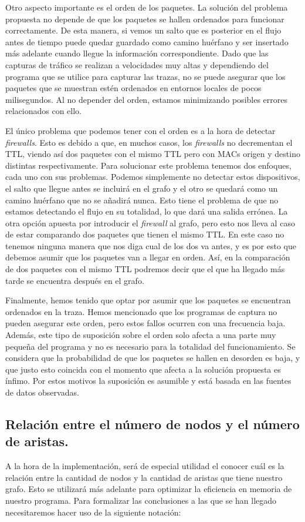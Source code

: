 \documentclass[tfg,epsbased,lof,lot,loa,covers,final,copyright,overleaf]{tfgtfmthesisuam}
\begin{document}
Otro aspecto importante es el orden de los paquetes. La solución del problema propuesta no depende de que los paquetes se hallen ordenados para funcionar correctamente. De esta manera, si vemos un salto que es posterior en el flujo antes de tiempo puede quedar guardado como camino huérfano y ser insertado más adelante cuando llegue la información correspondiente. Dado que las capturas de tráfico se realizan a velocidades muy altas y dependiendo del programa que se utilice para capturar las trazas, no se puede asegurar que los paquetes que se muestran estén ordenados en entornos locales de pocos milisegundos. Al no depender del orden, estamos minimizando posibles errores relacionados con ello.

El único problema que podemos tener con el orden es a la hora de detectar \textit{firewalls}. Esto es debido a que, en muchos casos, los \textit{firewalls} no decrementan el TTL, viendo así dos paquetes con el mismo TTL pero con MACs origen y destino distintas respectivamente. Para solucionar este problema tenemos dos enfoques, cada uno con sus problemas. Podemos simplemente no detectar estos dispositivos, el salto que llegue antes se incluirá en el grafo y el otro se quedará como un camino huérfano que no se añadirá nunca. Esto tiene el problema de que no estamos detectando el flujo en su totalidad, lo que dará una salida errónea. La otra opción apuesta por introducir el \textit{firewall} al grafo, pero esto nos lleva al caso de estar comparando dos paquetes que tienen el mismo TTL. En este caso no tenemos ninguna manera que nos diga cual de los dos va antes, y es por esto que debemos asumir que los paquetes van a llegar en orden. Así, en la comparación de dos paquetes con el mismo TTL podremos decir que el que ha llegado más tarde se encuentra después en el grafo.

Finalmente, hemos tenido que optar por asumir que los paquetes se encuentran ordenados en la traza. Hemos mencionado que los programas de captura no pueden asegurar este orden, pero estos fallos ocurren con una frecuencia baja. Además, este tipo de suposición sobre el orden solo afecta a una parte muy pequeña del programa y no es necesario para la totalidad del funcionamiento. Se considera que la probabilidad de que los paquetes se hallen en desorden es baja, y que justo esto coincida con el momento que afecta a la solución propuesta es ínfimo. Por estos motivos la suposición es asumible y está basada en las fuentes de datos observadas.

\subsection{Relación entre el número de nodos y el número de aristas.}
\label{sec:Analisis:Edges per node}
A la hora de la implementación, será de especial utilidad el conocer cuál es la relación entre la cantidad de nodos y la cantidad de aristas que tiene nuestro grafo. Esto se utilizará más adelante para optimizar la eficiencia en memoria de nuestro programa. Para formalizar las conclusiones a las que se han llegado necesitaremos hacer uso de la siguiente notación:
\end{document}
